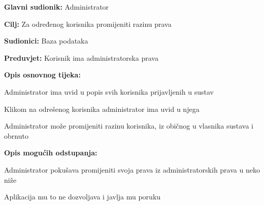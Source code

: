 					\noindent {}
					\begin{packed_item}
	
						\item \textbf{Glavni sudionik: }Administrator
						\item  \textbf{Cilj: }Za određenog korisnika promijeniti razinu prava
						\item  \textbf{Sudionici: }Baza podataka
						\item  \textbf{Preduvjet: }Korisnik ima administratorska prava
						\item  \textbf{Opis osnovnog tijeka:}
						
						\item[] \begin{packed_enum}
							\item Administrator ima uvid u popis svih korisnika prijavljenih u sustav
							\item Klikom na odrešenog korisnika administrator ima uvid u njega
							\item Administrator može promijeniti razinu korisnika, iz običnog u vlasnika sustava i obrnuto
						\end{packed_enum}
						
						\item  \textbf{Opis mogućih odstupanja:}
						
						\item[] \begin{packed_item}
	
							\item[2.a] Administrator pokušava promijeniti svoja prava iz administratorskih prava u neko niže
							\item[] \begin{packed_enum}
								\item Aplikacija mu to ne dozvoljava i javlja mu poruku
							\end{packed_enum}
						\end{packed_item}
					\end{packed_item}
					

